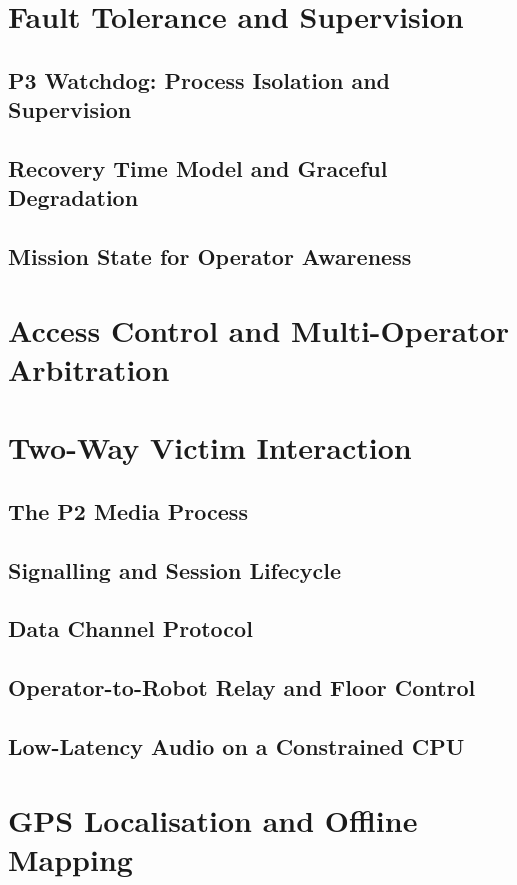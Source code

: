 \section{Fault Tolerance and Supervision}
\subsection{P3 Watchdog: Process Isolation and Supervision}
\subsection{Recovery Time Model and Graceful Degradation}
\subsection{Mission State for Operator Awareness}
\section{Access Control and Multi-Operator Arbitration}
\section{Two-Way Victim Interaction}
\subsection{The P2 Media Process}
\subsection{Signalling and Session Lifecycle}
\subsection{Data Channel Protocol}
\subsection{Operator-to-Robot Relay and Floor Control}
\subsection{Low-Latency Audio on a Constrained CPU}
\section{GPS Localisation and Offline Mapping}

